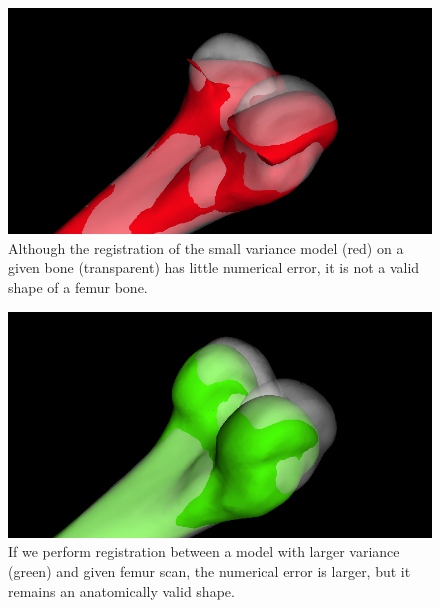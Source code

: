 \documentclass{article} %
\begin{document}
	\begin{minipage}[t]{0.45\linewidth}
	\begin{figure}[H]
		\centering
		\includegraphics[width=.9\textwidth]{img/badModel.png}
		\caption{Although the registration of the small variance model (red) on a given bone (transparent) has little numerical error, it is not a valid shape of a femur bone.}
	    \label{fig:badModel}
	\end{figure}
	\end{minipage}
	\hfill
	\begin{minipage}[t]{0.45\linewidth}
	\begin{figure}[H]
		\centering
		\includegraphics[width=.9\textwidth]{img/goodModel.png}
		\caption{If we perform registration between a model with larger variance (green) and given femur scan, the numerical error is larger, but it remains an anatomically valid shape.}
	\label{fig:goodModel}
	\end{figure}
	\end{minipage}
\end{document}
